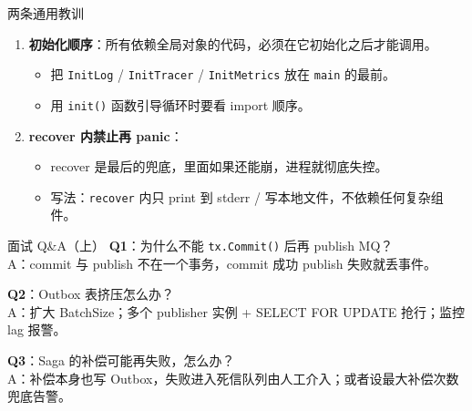\begin{frame}{两条通用教训}
\begin{enumerate}
  \item \textbf{初始化顺序}：所有依赖全局对象的代码，必须在它初始化之后才能调用。
  \begin{itemize}
    \item 把 \texttt{InitLog} / \texttt{InitTracer} / \texttt{InitMetrics} 放在 \texttt{main} 的最前。
    \item 用 \texttt{init()} 函数引导循环时要看 import 顺序。
  \end{itemize}
  \item \textbf{recover 内禁止再 panic}：
  \begin{itemize}
    \item recover 是最后的兜底，里面如果还能崩，进程就彻底失控。
    \item 写法：\texttt{recover} 内只 print 到 stderr / 写本地文件，不依赖任何复杂组件。
  \end{itemize}
\end{enumerate}
\end{frame}

\appendix

\begin{frame}{面试 Q\&A（上）}
\textbf{Q1}：为什么不能 \texttt{tx.Commit()} 后再 publish MQ？\\
\hspace{4mm}\small A：commit 与 publish 不在一个事务，commit 成功 publish 失败就丢事件。

\vspace{2mm}
\textbf{Q2}：Outbox 表挤压怎么办？\\
\hspace{4mm}\small A：扩大 BatchSize；多个 publisher 实例 + SELECT FOR UPDATE 抢行；监控 lag 报警。

\vspace{2mm}
\textbf{Q3}：Saga 的补偿可能再失败，怎么办？\\
\hspace{4mm}\small A：补偿本身也写 Outbox，失败进入死信队列由人工介入；或者设最大补偿次数兜底告警。
\end{frame}

